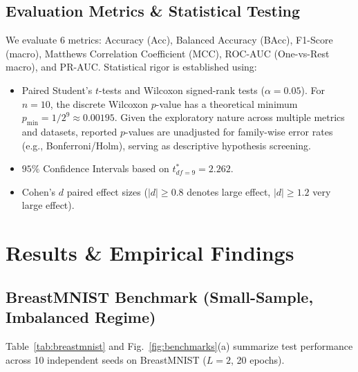 \documentclass[journal]{IEEEtran}
\begin{document}
\subsection{Evaluation Metrics \& Statistical Testing}
We evaluate $6$ metrics: Accuracy (Acc), Balanced Accuracy (BAcc), F1-Score (macro), Matthews Correlation Coefficient (MCC), ROC-AUC (One-vs-Rest macro), and PR-AUC. Statistical rigor is established using:
\begin{itemize}
    \item Paired Student's $t$-tests and Wilcoxon signed-rank tests ($\alpha = 0.05$). For $n=10$, the discrete Wilcoxon $p$-value has a theoretical minimum $p_{\min} = 1/2^9 \approx 0.00195$. Given the exploratory nature across multiple metrics and datasets, reported $p$-values are unadjusted for family-wise error rates (e.g., Bonferroni/Holm), serving as descriptive hypothesis screening.
    \item $95\%$ Confidence Intervals based on $t_{df=9}^* = 2.262$.
    \item Cohen's $d$ paired effect sizes ($|d| \ge 0.8$ denotes large effect, $|d| \ge 1.2$ very large effect).
\end{itemize}

\section{Results \& Empirical Findings}

\subsection{BreastMNIST Benchmark (Small-Sample, Imbalanced Regime)}
Table~\ref{tab:breastmnist} and Fig.~\ref{fig:benchmarks}(a) summarize test performance across 10 independent seeds on BreastMNIST ($L=2$, 20 epochs).
\end{document}
